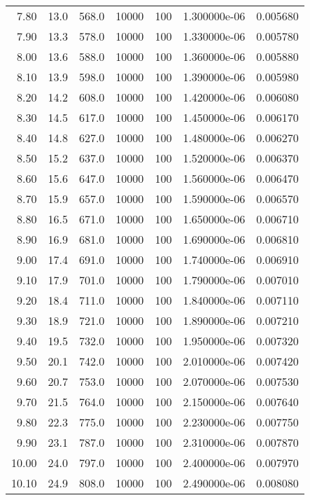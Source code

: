\begin{tabular}{rrrrrrr}
  7.80 &     13.0 &    568.0 & 10000 & 100 & 1.300000e-06 & 0.005680 \\
  7.90 &     13.3 &    578.0 & 10000 & 100 & 1.330000e-06 & 0.005780 \\
  8.00 &     13.6 &    588.0 & 10000 & 100 & 1.360000e-06 & 0.005880 \\
  8.10 &     13.9 &    598.0 & 10000 & 100 & 1.390000e-06 & 0.005980 \\
  8.20 &     14.2 &    608.0 & 10000 & 100 & 1.420000e-06 & 0.006080 \\
  8.30 &     14.5 &    617.0 & 10000 & 100 & 1.450000e-06 & 0.006170 \\
  8.40 &     14.8 &    627.0 & 10000 & 100 & 1.480000e-06 & 0.006270 \\
  8.50 &     15.2 &    637.0 & 10000 & 100 & 1.520000e-06 & 0.006370 \\
  8.60 &     15.6 &    647.0 & 10000 & 100 & 1.560000e-06 & 0.006470 \\
  8.70 &     15.9 &    657.0 & 10000 & 100 & 1.590000e-06 & 0.006570 \\
  8.80 &     16.5 &    671.0 & 10000 & 100 & 1.650000e-06 & 0.006710 \\
  8.90 &     16.9 &    681.0 & 10000 & 100 & 1.690000e-06 & 0.006810 \\
  9.00 &     17.4 &    691.0 & 10000 & 100 & 1.740000e-06 & 0.006910 \\
  9.10 &     17.9 &    701.0 & 10000 & 100 & 1.790000e-06 & 0.007010 \\
  9.20 &     18.4 &    711.0 & 10000 & 100 & 1.840000e-06 & 0.007110 \\
  9.30 &     18.9 &    721.0 & 10000 & 100 & 1.890000e-06 & 0.007210 \\
  9.40 &     19.5 &    732.0 & 10000 & 100 & 1.950000e-06 & 0.007320 \\
  9.50 &     20.1 &    742.0 & 10000 & 100 & 2.010000e-06 & 0.007420 \\
  9.60 &     20.7 &    753.0 & 10000 & 100 & 2.070000e-06 & 0.007530 \\
  9.70 &     21.5 &    764.0 & 10000 & 100 & 2.150000e-06 & 0.007640 \\
  9.80 &     22.3 &    775.0 & 10000 & 100 & 2.230000e-06 & 0.007750 \\
  9.90 &     23.1 &    787.0 & 10000 & 100 & 2.310000e-06 & 0.007870 \\
 10.00 &     24.0 &    797.0 & 10000 & 100 & 2.400000e-06 & 0.007970 \\
 10.10 &     24.9 &    808.0 & 10000 & 100 & 2.490000e-06 & 0.008080 \\

\end{tabular}
